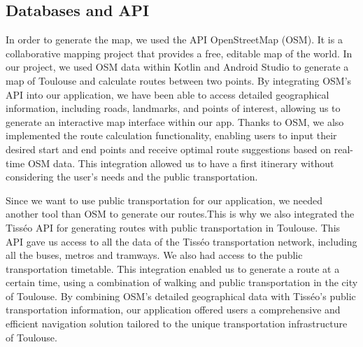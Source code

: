 \subsection{Databases and API}
In order to generate the map, we used the API OpenStreetMap (OSM). It is a collaborative mapping project that provides a free, editable map of the world. In our project, we used OSM data within Kotlin and Android Studio to generate a map of Toulouse and calculate routes between two points. By integrating OSM's API into our application, we have been able to access detailed geographical information, including roads, landmarks, and points of interest, allowing us to generate an interactive map interface within our app. Thanks to OSM, we also implemented the route calculation functionality, enabling users to input their desired start and end points and receive optimal route suggestions based on real-time OSM data. This integration allowed us to have a first itinerary without considering the user’s needs and the public transportation. \newline

Since we want to use public transportation for our application, we needed another tool than OSM to generate our routes.This is why we also integrated the Tisséo API for generating routes with public transportation in Toulouse. This API gave us access to all the data of the Tisséo transportation network, including all the buses, metros and tramways. We also had access to the public transportation timetable. This integration enabled us to generate a route at a certain time, using a combination of walking and public transportation in the city of Toulouse. By combining OSM's detailed geographical data with Tisséo's public transportation information, our application offered users a comprehensive and efficient navigation solution tailored to the unique transportation infrastructure of Toulouse. \newline


